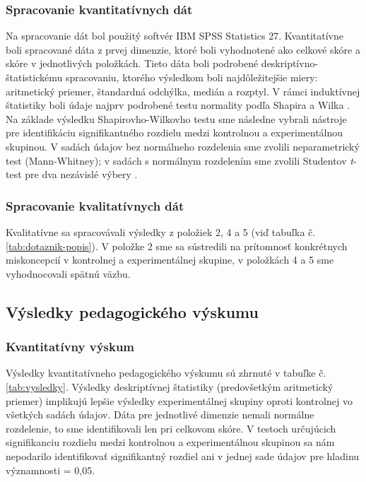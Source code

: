 \subsubsection{Spracovanie kvantitatívnych dát}
Na spracovanie dát bol použitý softvér IBM SPSS Statistics 27. Kvantitatívne boli spracované dáta z prvej dimenzie, ktoré boli vyhodnotené ako celkové skóre a skóre v jednotlivých položkách.
Tieto dáta boli podrobené deskriptívno-štatistickému spracovaniu, ktorého výsledkom boli najdôležitejšie miery: aritmetický priemer, štandardná odchýlka, 
medián a rozptyl. V rámci induktívnej štatistiky boli údaje najprv podrobené testu normality podľa Shapira a Wilka \cite{mohdrazaliPowerComparisonsShapirowilk2011, komendaAnalyzaNahodnehoPedagogickem1981, shapiroAnalysisVarianceTest1965}.
Na základe výsledku Shapirovho-Wilkovho testu sme následne vybrali nástroje pre identifikáciu signifikantného rozdielu medzi kontrolnou a experimentálnou skupinou. V sadách údajov bez normálneho rozdelenia sme zvolili 
neparametrický test (Mann-Whitney); v sadách s normálnym rozdelením sme zvolili Studentov \emph{t}-test pre dva nezávislé výbery \cite{svecMetodologieVedVychove2009,komendaAnalyzaNahodnehoPedagogickem1981,proksaMetodologiaPedagogickehoVyskumu2008}. 

\subsubsection{Spracovanie kvalitatívnych dát}
Kvalitatívne sa spracovávali výsledky z položiek 2, 4 a 5 (viď tabuľka č. \ref{tab:dotaznik-popis}). V položke 2 sme sa sústredili na prítomnosť konkrétnych miskoncepcií v kontrolnej a experimentálnej skupine, v položkách 4 a 5 sme 
vyhodnocovali spätnú väzbu. 

\subsection{Výsledky pedagogického výskumu}
\subsubsection{Kvantitatívny výskum}
Výsledky kvantitatívneho pedagogického výskumu sú zhrnuté v tabuľke č. \ref{tab:vysledky}. Výsledky deskriptívnej štatistiky (predovšetkým aritmetický priemer) implikujú lepšie výsledky experimentálnej skupiny oproti 
kontrolnej vo všetkých sadách údajov. Dáta pre jednotlivé dimenzie nemali normálne rozdelenie, to sme identifikovali len pri celkovom skóre. V testoch určujúcich signifikanciu rozdielu medzi kontrolnou a experimentálnou
skupinou sa nám nepodarilo identifikovať signifikantný rozdiel ani v jednej sade údajov pre hladinu významnosti \alpha{} = 0,05.

